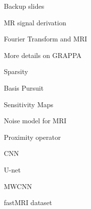 \begin{frame}{}
    Backup slides
\end{frame}

\begin{frame}{MR signal derivation}
    
\end{frame}

\begin{frame}{Fourier Transform and MRI}
    
\end{frame}

\begin{frame}{More details on GRAPPA}
    
\end{frame}

\begin{frame}{Sparsity}
    
\end{frame}

\begin{frame}{Basis Pursuit}
    
\end{frame}

\begin{frame}{Sensitivity Maps}
    
\end{frame}

\begin{frame}{Noise model for MRI}
    
\end{frame}

\begin{frame}{Proximity operator}
    
\end{frame}

\begin{frame}{CNN}
    
\end{frame}

\begin{frame}{U-net}
    
\end{frame}

\begin{frame}{MWCNN}
    
\end{frame}

\begin{frame}{fastMRI dataset}
    
\end{frame}


